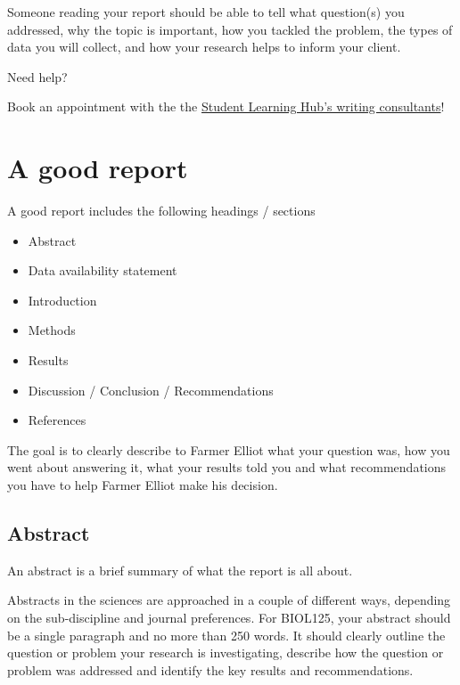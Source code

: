 \documentclass[
]{book}
\providecommand{\tightlist}{%
  \setlength{\itemsep}{0pt}\setlength{\parskip}{0pt}}
\begin{document}
Someone reading your report should be able to tell what question(s) you addressed, why the topic is important, how you tackled the problem, the types of data you will collect, and how your research helps to inform your client.

Need help?

Book an appointment with the the \href{https://students.ok.ubc.ca/academic-success/learning-hub/writing-language/}{Student Learning Hub's writing consultants}!

\hypertarget{a-good-report}{%
\section*{A good report}\label{a-good-report}}

A good report includes the following headings / sections

\begin{itemize}
\tightlist
\item
  Abstract
\item
  Data availability statement
\item
  Introduction
\item
  Methods
\item
  Results
\item
  Discussion / Conclusion / Recommendations
\item
  References
\end{itemize}

The goal is to clearly describe to Farmer Elliot what your question was, how you went about answering it, what your results told you and what recommendations you have to help Farmer Elliot make his decision.

\hypertarget{abstract}{%
\subsection*{Abstract}\label{abstract}}

An abstract is a brief summary of what the report is all about.

Abstracts in the sciences are approached in a couple of different ways, depending on the sub-discipline and journal preferences. For BIOL125, your abstract should be a single paragraph and no more than 250 words. It should clearly outline the question or problem your research is investigating, describe how the question or problem was addressed and identify the key results and recommendations.
\end{document}
